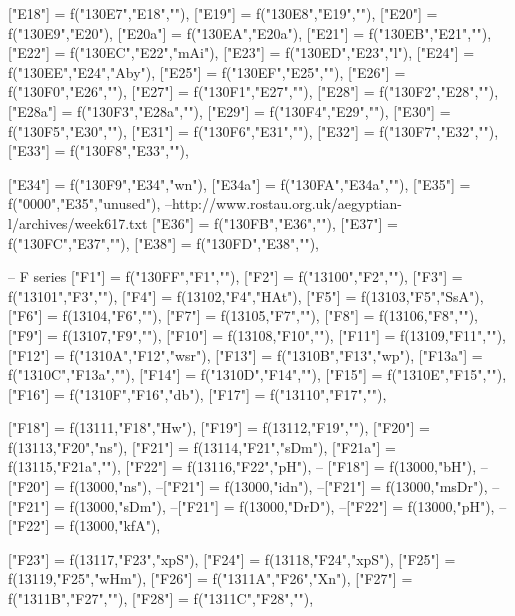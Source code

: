\documentclass{article}
\begin{document}
\begin{luacode*}
{	["E18"] = f("130E7","E18",""),
	["E19"] = f("130E8","E19",""),
	["E20"] = f("130E9","E20"),
	["E20a"] = f("130EA","E20a"),
	["E21"] = f("130EB","E21",""),
	["E22"] = f("130EC","E22","mAi"),
	["E23"] = f("130ED","E23","l"),
	["E24"] = f("130EE","E24","Aby"),
	["E25"] = f("130EF","E25",""),
	["E26"] = f("130F0","E26",""),
	["E27"] = f("130F1","E27",""),
	["E28"] = f("130F2","E28",""),
	["E28a"] = f("130F3","E28a",""),
	["E29"] = f("130F4","E29",""),
	["E30"] = f("130F5","E30",""),
	["E31"] = f("130F6","E31",""),
	["E32"] = f("130F7","E32",""),
	["E33"] = f("130F8","E33",""),

	["E34"] = f("130F9","E34","wn"),
	["E34a"] = f("130FA","E34a",""),
	["E35"] = f("0000","E35","unused"), --http://www.rostau.org.uk/aegyptian-l/archives/week617.txt
	["E36"] = f("130FB","E36",""),
	["E37"] = f("130FC","E37",""),
	["E38"] = f("130FD","E38",""),

-- F series
	["F1"] = f("130FF","F1",""),
	["F2"] = f("13100","F2",""),
	["F3"] = f("13101","F3",""),
	["F4"] = f(13102,"F4","HAt"),
	["F5"] = f(13103,"F5","SsA"),
	["F6"] = f(13104,"F6",""),
	["F7"] = f(13105,"F7",""),
	["F8"] = f(13106,"F8",""),
	["F9"] = f(13107,"F9",""),
	["F10"] = f(13108,"F10",""),
	["F11"] = f(13109,"F11",""),
	["F12"] = f("1310A","F12","wsr"),
	["F13"] = f("1310B","F13","wp"),
	["F13a"] = f("1310C","F13a",""),
	["F14"] = f("1310D","F14",""),
	["F15"] = f("1310E","F15",""),
	["F16"] = f("1310F","F16","db"),
	["F17"] = f("13110","F17",""),

	["F18"] = f(13111,"F18","Hw"),
["F19"] = f(13112,"F19",""),
["F20"] = f(13113,"F20","ns"),
["F21"] = f(13114,"F21","sDm"),
["F21a"] = f(13115,"F21a",""),
["F22"] = f(13116,"F22","pH"),
	-- ["F18"] = f(13000,"bH"),
	--["F20"] = f(13000,"ns"),
	--["F21"] = f(13000,"idn"),
	--["F21"] = f(13000,"msDr"),
	--["F21"] = f(13000,"sDm"),
	--["F21"] = f(13000,"DrD"),
	--["F22"] = f(13000,"pH"),
	--["F22"] = f(13000,"kfA"),

	["F23"] = f(13117,"F23","xpS"),
	["F24"] = f(13118,"F24","xpS"),
	["F25"] = f(13119,"F25","wHm"),
	["F26"] = f("1311A","F26","Xn"),
	["F27"] = f("1311B","F27",""),
	["F28"] = f("1311C","F28",""),

}
\end{luacode*}
\end{document}
